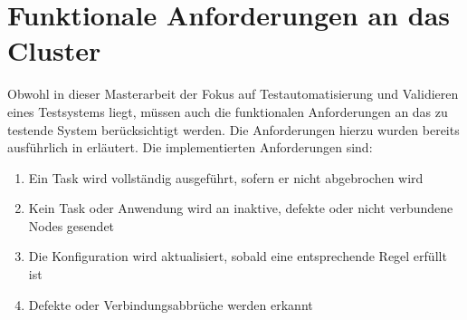 \section{Funktionale Anforderungen an das Cluster}
\label{sec:clusterRequirements}

Obwohl in dieser Masterarbeit der Fokus auf Testautomatisierung und Validieren eines Testsystems liegt, müssen auch die funktionalen Anforderungen an das zu testende System berücksichtigt werden.
Die Anforderungen hierzu wurden bereits ausführlich in \cite{Eberhardinger2018} erläutert.
Die implementierten Anforderungen sind:

\begin{enumerate}
    \item Ein Task wird vollständig ausgeführt, sofern er nicht abgebrochen wird
    \item Kein Task oder Anwendung wird an inaktive, defekte oder nicht verbundene Nodes gesendet
    \item Die Konfiguration wird aktualisiert, sobald eine entsprechende Regel erfüllt ist
    \item Defekte oder Verbindungsabbrüche werden erkannt
\end{enumerate}
